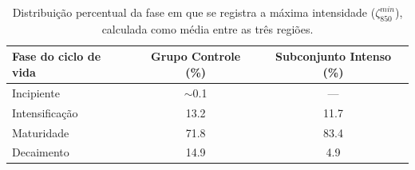 \begin{table}[ht]
\centering
\caption{Distribuição percentual da fase em que se registra a máxima intensidade ($\zeta_{850}^{min}$), calculada como média entre as três regiões.}
\label{tab:fase_max_intensidad}
\begin{tabular*}{\textwidth}{@{\extracolsep{\fill}}lcc}
\hline
Fase do ciclo de vida & Grupo Controle (\%) & Subconjunto Intenso (\%) \\ 
\hline
Incipiente       & $\sim$0.1 & ---  \\
Intensificação   & 13.2      & 11.7 \\
Maturidade       & 71.8      & 83.4 \\
Decaimento       & 14.9      & 4.9  \\ 
\hline
\end{tabular*}
\end{table}